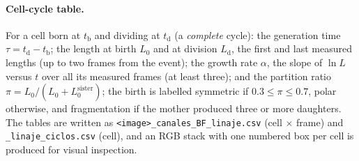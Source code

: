 \documentclass[11pt,a4paper]{article}
\begin{document}
\paragraph{Cell-cycle table.} For a cell born at $t_{\mathrm b}$ and dividing at $t_{\mathrm d}$ (a \emph{complete} cycle): the generation time $\tau=t_{\mathrm d}-t_{\mathrm b}$; the length at birth $L_0$ and at division $L_{\mathrm d}$, the first and last measured lengths (up to two frames from the event); the growth rate $\alpha$, the slope of $\ln L$ versus $t$ over all its measured frames (at least three); and the partition ratio $\pi=L_0/(L_0+L_0^{\mathrm{sister}})$; the birth is labelled symmetric if $0.3\le\pi\le0.7$, polar otherwise, and fragmentation if the mother produced three or more daughters. The tables are written as \texttt{<image>\_canales\_BF\_linaje.csv} (cell $\times$ frame) and \texttt{\_linaje\_ciclos.csv} (cell), and an RGB stack with one numbered box per cell is produced for visual inspection.
\end{document}
